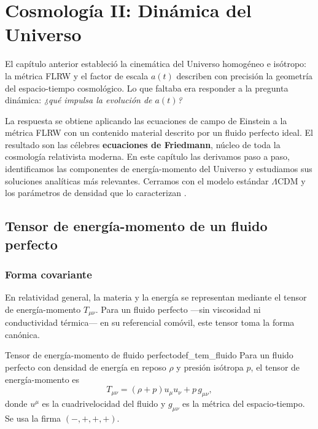 
\chapter{Cosmología II: Dinámica del Universo}
\label{cap:friedmann}

El capítulo anterior estableció la cinemática del Universo homogéneo e isótropo: la métrica FLRW y el factor de escala $a(t)$ describen con precisión la geometría del espacio-tiempo cosmológico. Lo que faltaba era responder a la pregunta dinámica: \emph{¿qué impulsa la evolución de $a(t)$?}

La respuesta se obtiene aplicando las ecuaciones de campo de Einstein a la métrica FLRW con un contenido material descrito por un fluido perfecto ideal. El resultado son las célebres \textbf{ecuaciones de Friedmann}, núcleo de toda la cosmología relativista moderna. En este capítulo las derivamos paso a paso, identificamos las componentes de energía-momento del Universo y estudiamos sus soluciones analíticas más relevantes. Cerramos con el modelo estándar $\Lambda$CDM y los parámetros de densidad que lo caracterizan \cite{Peebles1993, Weinberg2008, Ryden2017, Planck2020}.

\section{Tensor de energía-momento de un fluido perfecto}
\label{sec:tem_fluido_perfecto}

\subsection{Forma covariante}

En relatividad general, la materia y la energía se representan mediante el tensor de energía-momento $T_{\mu\nu}$. Para un fluido perfecto —sin viscosidad ni conductividad térmica— en su referencial comóvil, este tensor toma la forma canónica.

\begin{definicion}{Tensor de energía-momento de fluido perfecto}{def_tem_fluido}
Para un fluido perfecto con densidad de energía en reposo $\rho$ y presión isótropa $p$, el tensor de energía-momento es
\begin{equation}
  T_{\mu\nu} = (\rho + p)u_\mu u_\nu + p\,g_{\mu\nu},
  \label{eq:tem_fluido}
\end{equation}
donde $u^\mu$ es la cuadrivelocidad del fluido y $g_{\mu\nu}$ es la métrica del espacio-tiempo. Se usa la firma $(-,+,+,+)$.
\end{definicion}

